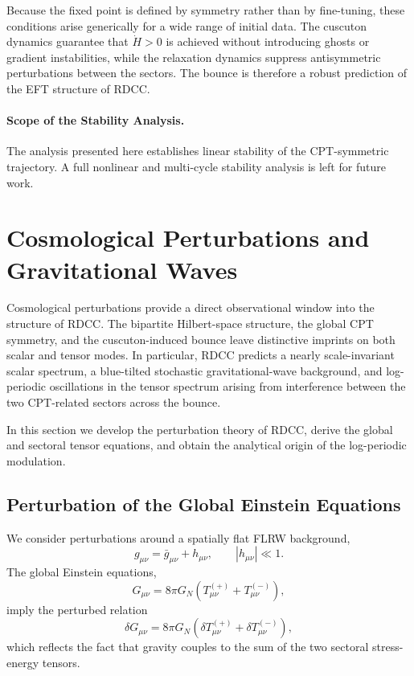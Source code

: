 \documentclass[11pt,a4paper]{article}
\begin{document}
Because the fixed point is defined by symmetry rather than by fine-tuning, these
conditions arise generically for a wide range of initial data. The cuscuton
dynamics guarantee that \(\dot{H} > 0\) is achieved without introducing ghosts or
gradient instabilities, while the relaxation dynamics suppress antisymmetric
perturbations between the sectors. The bounce is therefore a robust prediction
of the EFT structure of RDCC.

\paragraph{Scope of the Stability Analysis.}
The analysis presented here establishes linear stability of the CPT-symmetric
trajectory. A full nonlinear and multi-cycle stability analysis is left for
future work.

\clearpage

\section{Cosmological Perturbations and Gravitational Waves}
\label{sec:perturbations}

Cosmological perturbations provide a direct observational window into the
structure of RDCC. The bipartite Hilbert-space structure, the global CPT
symmetry, and the cuscuton-induced bounce leave distinctive imprints on both
scalar and tensor modes. In particular, RDCC predicts a nearly scale-invariant
scalar spectrum, a blue-tilted stochastic gravitational-wave background, and
log-periodic oscillations in the tensor spectrum arising from interference
between the two CPT-related sectors across the bounce.

In this section we develop the perturbation theory of RDCC, derive the global
and sectoral tensor equations, and obtain the analytical origin of the
log-periodic modulation.

\subsection{Perturbation of the Global Einstein Equations}

We consider perturbations around a spatially flat FLRW background,
\begin{equation}
    g_{\mu\nu}
    = \bar{g}_{\mu\nu} + h_{\mu\nu},
    \qquad |h_{\mu\nu}| \ll 1.
\end{equation}
The global Einstein equations,
\begin{equation}
    G_{\mu\nu}
    = 8\pi G_{N}\left(T^{(+)}_{\mu\nu} + T^{(-)}_{\mu\nu}\right),
\end{equation}
imply the perturbed relation
\begin{equation}
    \delta G_{\mu\nu}
    = 8\pi G_{N}\left(
        \delta T^{(+)}_{\mu\nu}
        + \delta T^{(-)}_{\mu\nu}
    \right),
    \label{eq:globalPerturbation}
\end{equation}
which reflects the fact that gravity couples to the sum of the two sectoral
stress-energy tensors.
\end{document}
